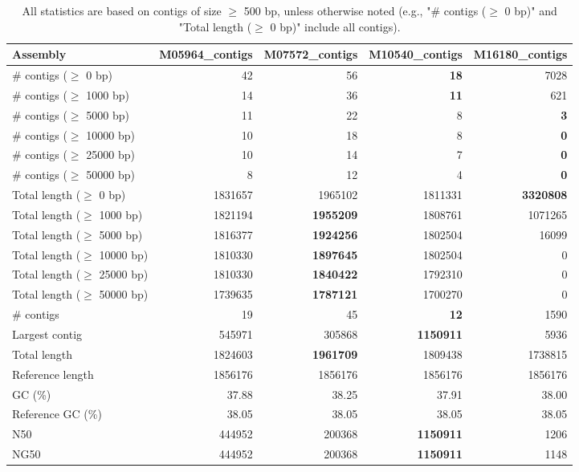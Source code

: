 \documentclass[12pt,a4paper]{article}
\begin{document}
\begin{table}[ht]
\begin{center}
\caption{All statistics are based on contigs of size $\geq$ 500 bp, unless otherwise noted (e.g., "\# contigs ($\geq$ 0 bp)" and "Total length ($\geq$ 0 bp)" include all contigs).}
\begin{tabular}{|l*{4}{|r}|}
\hline
Assembly & M05964\_contigs & M07572\_contigs & M10540\_contigs & M16180\_contigs \\ \hline
\# contigs ($\geq$ 0 bp) & 42 & 56 & {\bf 18} & 7028 \\ \hline
\# contigs ($\geq$ 1000 bp) & 14 & 36 & {\bf 11} & 621 \\ \hline
\# contigs ($\geq$ 5000 bp) & 11 & 22 & 8 & {\bf 3} \\ \hline
\# contigs ($\geq$ 10000 bp) & 10 & 18 & 8 & {\bf 0} \\ \hline
\# contigs ($\geq$ 25000 bp) & 10 & 14 & 7 & {\bf 0} \\ \hline
\# contigs ($\geq$ 50000 bp) & 8 & 12 & 4 & {\bf 0} \\ \hline
Total length ($\geq$ 0 bp) & 1831657 & 1965102 & 1811331 & {\bf 3320808} \\ \hline
Total length ($\geq$ 1000 bp) & 1821194 & {\bf 1955209} & 1808761 & 1071265 \\ \hline
Total length ($\geq$ 5000 bp) & 1816377 & {\bf 1924256} & 1802504 & 16099 \\ \hline
Total length ($\geq$ 10000 bp) & 1810330 & {\bf 1897645} & 1802504 & 0 \\ \hline
Total length ($\geq$ 25000 bp) & 1810330 & {\bf 1840422} & 1792310 & 0 \\ \hline
Total length ($\geq$ 50000 bp) & 1739635 & {\bf 1787121} & 1700270 & 0 \\ \hline
\# contigs & 19 & 45 & {\bf 12} & 1590 \\ \hline
Largest contig & 545971 & 305868 & {\bf 1150911} & 5936 \\ \hline
Total length & 1824603 & {\bf 1961709} & 1809438 & 1738815 \\ \hline
Reference length & 1856176 & 1856176 & 1856176 & 1856176 \\ \hline
GC (\%) & 37.88 & 38.25 & 37.91 & 38.00 \\ \hline
Reference GC (\%) & 38.05 & 38.05 & 38.05 & 38.05 \\ \hline
N50 & 444952 & 200368 & {\bf 1150911} & 1206 \\ \hline
NG50 & 444952 & 200368 & {\bf 1150911} & 1148 \\ \hline

\end{tabular}
\end{center}
\end{table}
\end{document}
